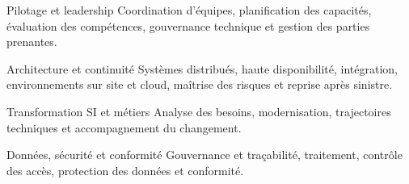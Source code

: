 
\begin{cvskills}

    \cvskill
    {Pilotage et leadership}
    {Coordination d’équipes, planification des capacités, évaluation des compétences, gouvernance technique et gestion des parties prenantes.}

    \cvskill
    {Architecture et continuité}
    {Systèmes distribués, haute disponibilité, intégration, environnements sur site et cloud, maîtrise des risques et reprise après sinistre.}

    \cvskill
    {Transformation SI et métiers}
    {Analyse des besoins, modernisation, trajectoires techniques et accompagnement du changement.}

    \cvskill
    {Données, sécurité et conformité}
    {Gouvernance et traçabilité, traitement, contrôle des accès, protection des données et conformité.}

\end{cvskills}
